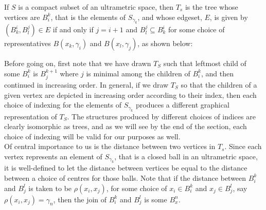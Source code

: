 \begin{definition}
If $S$ is a compact subset of an ultrametric space, then $T_s$ is the tree whose vertices are $B^k_i$, that is the elements of $S_{\gamma_k}$, and whose edgeset, $E$, is given by $ (B^i_k, B^j_l) \in E$ if and only if $ j = i+1$ and $B^j_l \subseteq B^i_k$ for some choice of representatives $B(x_k,\gamma_i)$ and $B(x_l, \gamma_j)$, as shown below:\\

\tikzset{font=\small,
level distance=1.75cm,
}

\begin{center}
\end{center}
\end{definition}

Before going on, first note that we have drawn $T_S$ such that leftmost child of some $B^k_i$ is $B^{k+1}_j$ where $j$ is minimal among the children of $B^k_i$, and then continued in increasing order. In general, if we draw $T_S$ so that the children of a given vertex are depicted in increasing order according to their index, then  each choice of indexing for the elements of $S_{\gamma_k}$ produces a different graphical representation of $T_S$. The structures produced by different choices of indices are clearly isomorphic as trees, and as we will see by the end of the section, each choice of indexing will be valid for our purposes as well.\\

Of central importance to us is the distance between two vertices in $T_s$. Since each vertex represents an element of $S_{\gamma_k}$, that is a closed ball in an ultrametric space, it is well-defined to let the distance between vertices be equal to the distance between a choice of centres for those balls. Note that if the distance between $B^k_i$ and $B^l_j$ is taken to be $\rho(x_i,x_j)$, for some choice of $x_i \in B^k_i$ and $x_j \in B^l_j$, say $\rho(x_i,x_j)=\gamma_n$, then the join of  $B^k_i$ and $B^l_j$ is some $B^n_x$.\\

